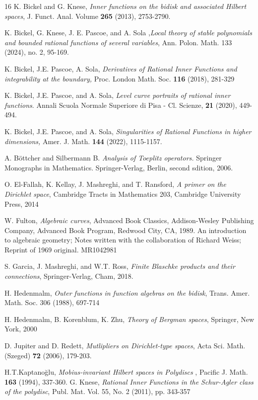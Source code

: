\documentclass[11pt]{amsart}
\numberwithin{equation}{section}
\begin{document}
\begin{thebibliography}{16}
 K. Bickel and G. Knese, \textit{Inner functions on the bidisk and associated Hilbert spaces}, J. Funct. Anal.
Volume {\bf 265} (2013), 2753-2790.

  K. Bickel, G. Knese, J. E. Pascoe, and A. Sola ,\textit{Local theory of stable polynomials and bounded rational functions of several variables}, Ann. Polon. Math. 133 (2024), no. 2, 95-169.

 K. Bickel, J.E. Pascoe, A. Sola, \textit{Derivatives of Rational Inner Functions and integrability at the boundary,}
Proc. London Math. Soc. {\bf 116} (2018), 281-329

 K. Bickel, J.E.  Pascoe, and A. Sola, \textit{Level curve portraits of rational inner functions}. Annali Scuola Normale Superiore di Pisa - Cl. Scienze, {\bf 21} (2020), 449-494.

 K. Bickel, J.E. Pascoe, and A. Sola, \textit{Singularities of Rational Functions in higher dimensions,} Amer. J. Math. {\bf 144} (2022), 1115-1157.

A. B\"ottcher and Silbermann B. \textit{Analysis of Toeplitz operators.} Springer Monographs in Mathematics. Springer-Verlag, Berlin, second sdition, 2006.


 O. El-Fallah, K. Kellay, J. Mashreghi, and T. Ransford, \textit{A primer on the Dirichlet space}, Cambridge
Tracts in Mathematics 203, Cambridge University Press, 2014

 W. Fulton, \textit{Algebraic curves}, Advanced Book Classics, Addison-Wesley Publishing Company, Advanced Book Program, Redwood City, CA, 1989. An introduction to algebraic geometry; Notes written
with the collaboration of Richard Weiss; Reprint of 1969 original. MR1042981

S. Garcia, J. Mashreghi, and W.T. Ross, \textit{Finite Blaschke products and their connections}, Springer-Verlag, Cham, 2018.

  H. Hedenmalm, \textit{Outer functions in function algebras on the bidisk}, Trans. Amer. Math. Soc. 306
(1988), 697-714

 H. Hedenmalm, B. Korenblum, K. Zhu, \textit{Theory of Bergman spaces}, Springer, New
York, 2000

D. Jupiter and D. Redett, \textit{Mutlipliers on Dirichlet-type spaces}, Acta Sci. Math. (Szeged) {\bf 72} (2006), 179-203.

 H.T.Kaptano\u{g}lu,  \textit{Mobius-invariant Hilbert spaces in Polydiscs }, Pacific J. Math. {\bf 163} (1994), 337-360.
 G. Knese, \textit{Rational Inner Functions in the Schur-Agler class of the polydisc}, Publ. Mat. Vol. 55, No. 2 (2011), pp. 343-357


\end{thebibliography}
\end{document}
